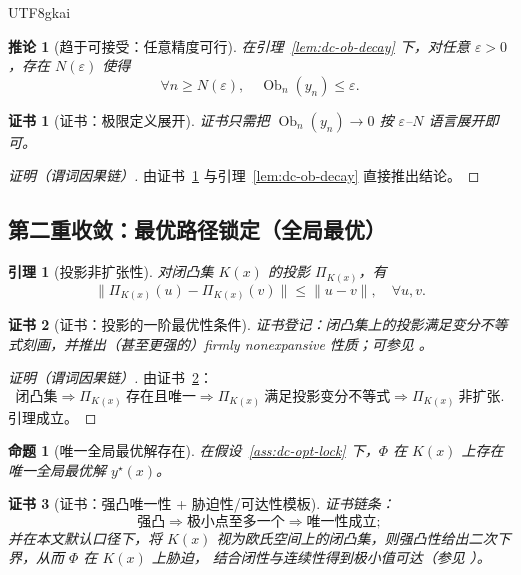 \documentclass[12pt]{article}
\newtheorem{proposition}{命题}[section]
\newtheorem{corollary}{推论}[section]
\newtheorem{lemma}{引理}[section]
\newtheorem{Certificate}{证书}[section]
\newcommand{\Ob}{\operatorname{Ob}}
\begin{document}
\begin{CJK*}{UTF8}{gkai}
\begin{corollary}[趋于可接受：任意精度可行]\label{cor:dc-eps-feasible}
在引理~\ref{lem:dc-ob-decay} 下，对任意 $\varepsilon>0$，存在 $N(\varepsilon)$ 使得
\[
\forall n\ge N(\varepsilon),\quad \Ob_n(y_n)\le \varepsilon.
\]
\end{corollary}

\begin{Certificate}[证书：极限定义展开]\label{cert:dc-eps-feasible}
证书只需把 $\Ob_n(y_n)\to 0$ 按 $\varepsilon$--$N$ 语言展开即可。
\end{Certificate}

\begin{proof}[证明（谓词因果链）]
由证书~\ref{cert:dc-eps-feasible} 与引理~\ref{lem:dc-ob-decay} 直接推出结论。
\end{proof}

\subsection{第二重收敛：最优路径锁定（全局最优）}
\label{subsec:double-convergence-optimality}

\begin{lemma}[投影非扩张性]\label{lem:dc-proj-nonexpansive}
对闭凸集 $K(x)$ 的投影 $\Pi_{K(x)}$，有
\[
\|\Pi_{K(x)}(u)-\Pi_{K(x)}(v)\|\le \|u-v\|,\quad \forall u,v.
\]
\end{lemma}

\begin{Certificate}[证书：投影的一阶最优性条件]\label{cert:dc-proj-nonexpansive}
证书登记：闭凸集上的投影满足变分不等式刻画，并推出（甚至更强的）firmly nonexpansive 性质；可参见 \cite{BauschkeCombettes2017}。
\end{Certificate}

\begin{proof}[证明（谓词因果链）]
由证书~\ref{cert:dc-proj-nonexpansive}：
\[
\text{闭凸集}\Rightarrow \Pi_{K(x)}\ \text{存在且唯一}
\Rightarrow \Pi_{K(x)}\ \text{满足投影变分不等式}
\Rightarrow \Pi_{K(x)}\ \text{非扩张}.
\]
引理成立。
\end{proof}

\begin{proposition}[唯一全局最优解存在]\label{prop:dc-unique-opt}
在假设~\ref{ass:dc-opt-lock} 下，$\Phi$ 在 $K(x)$ 上存在唯一全局最优解 $y^\star(x)$。
\end{proposition}

\begin{Certificate}[证书：强凸唯一性 + 胁迫性/可达性模板]\label{cert:dc-unique-opt}
证书链条：
\[
\text{强凸}\Rightarrow \text{极小点至多一个}
\Rightarrow \text{唯一性成立};
\]
并在本文默认口径下，将 $K(x)$ 视为欧氏空间上的闭凸集，则强凸性给出二次下界，从而 $\Phi$ 在 $K(x)$ 上胁迫，
结合闭性与连续性得到极小值可达（参见 \cite{BoydVandenberghe2004,Beck2017}）。
\end{Certificate}


\end{CJK*}
\end{document}
